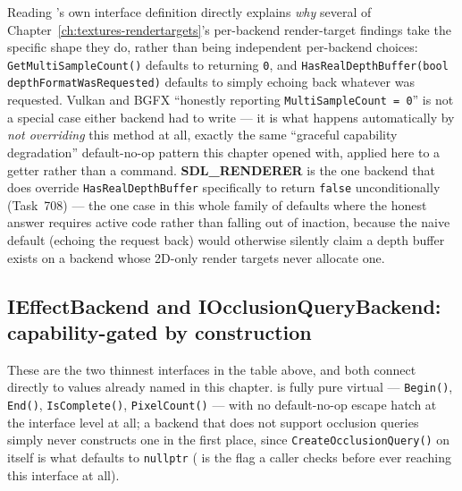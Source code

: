 Reading 's own interface definition directly explains
\emph{why} several of Chapter~\ref{ch:textures-rendertargets}'s per-backend render-target
findings take the specific shape they do, rather than being independent per-backend choices:
\texttt{GetMultiSampleCount()} defaults to returning \texttt{0}, and
\texttt{HasRealDepthBuffer(bool depthFormatWasRequested)} defaults to simply echoing back
whatever was requested. Vulkan and BGFX ``honestly reporting \texttt{MultiSampleCount = 0}''
is not a special case either backend had to write --- it is what happens automatically by
\emph{not overriding} this method at all, exactly the same ``graceful capability degradation''
default-no-op pattern this chapter opened with, applied here to a getter rather than a
command. \textbf{SDL\_RENDERER} is the one backend that does override
\texttt{HasRealDepthBuffer} specifically to return \texttt{false} unconditionally (Task~708)
--- the one case in this whole family of defaults where the honest answer requires active
code rather than falling out of inaction, because the naive default (echoing the request back)
would otherwise silently claim a depth buffer exists on a backend whose 2D-only render targets
never allocate one.

\subsection{IEffectBackend and IOcclusionQueryBackend: capability-gated by construction}

These are the two thinnest interfaces in the table above, and both connect directly to
 values already named in this chapter.
 is fully pure virtual --- \texttt{Begin()}, \texttt{End()},
\texttt{IsComplete()}, \texttt{PixelCount()} --- with no default-no-op escape hatch at the
interface level at all; a backend that does not support occlusion queries simply never
constructs one in the first place, since \texttt{CreateOcclusionQuery()} on
 itself is what defaults to \texttt{nullptr}
( is the flag a caller checks before ever
reaching this interface at all).

